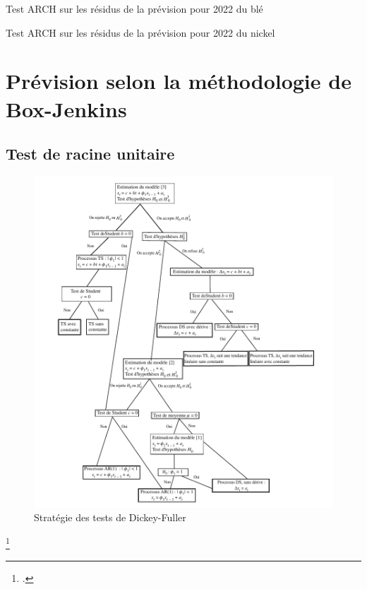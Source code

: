 \documentclass[12pt,a4paper]{article}
\begin{document}
\begin{table}[H]
    \centering
    \caption{Test ARCH sur les résidus de la prévision pour 2022 du blé}
    \sffamily
    \resizebox{0.8\textwidth}{!}{}
\end{table}

\begin{table}[H]
    \centering
    \caption{Test ARCH sur les résidus de la prévision pour 2022 du nickel}
    \sffamily
    \resizebox{0.8\textwidth}{!}{}
\end{table}
\clearpage
\section{Prévision selon la méthodologie de Box-Jenkins}
\setcounter{table}{0}
\setcounter{figure}{0}
\subsection{Test de racine unitaire}
\begin{figure}[H]
    \centering
    \includegraphics[width=\textwidth]{annexe/4_2_df_test.pdf}
    \caption[df_test]{Stratégie des tests de Dickey-Fuller\footnotemark}
\end{figure}
\footcitetext{terraza}
\end{document}
